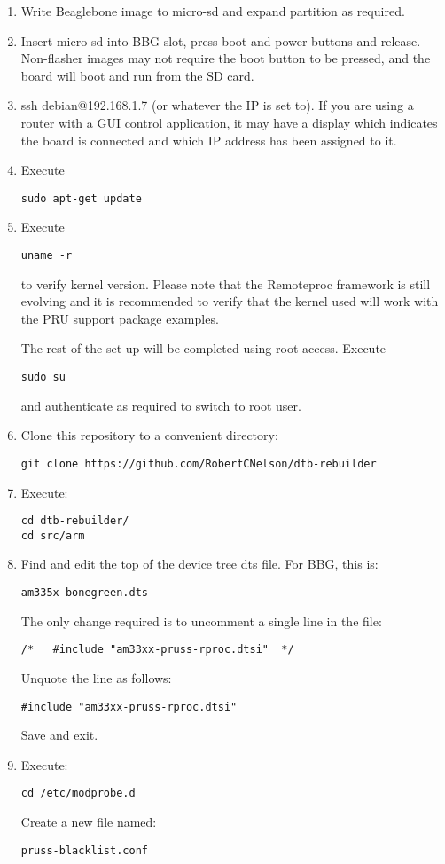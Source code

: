\begin{enumerate}
\item  Write Beaglebone image to micro-sd and expand partition as required.
\item  Insert micro-sd into BBG slot, press boot and power buttons and release.  Non-flasher images may not require the boot button to be pressed, and the board will boot and run from the SD card.
\item  ssh debian@192.168.1.7 (or whatever the IP is set to).  If you are using a router with a GUI control application, it may have a display which indicates the board is connected and which IP address has been assigned to it.
\item  Execute
\begin{verbatim}
sudo apt-get update
\end{verbatim}
\item  Execute
\begin{verbatim}
uname -r
\end{verbatim} 
to verify kernel version.  Please note that the Remoteproc framework is still evolving and it is recommended to verify that the kernel used will work with the PRU support package examples.

The rest of the set-up will be completed using root access.
Execute
\begin{verbatim}
sudo su
\end{verbatim}
and authenticate as required to switch to root user.
\item Clone this repository to a convenient directory:

\begin{verbatim}
git clone https://github.com/RobertCNelson/dtb-rebuilder
\end{verbatim}

\item Execute:
\begin{verbatim}
cd dtb-rebuilder/ 
cd src/arm
\end{verbatim}
\item Find and edit the top of the device tree dts file.
For BBG, this is:
\begin{verbatim}
am335x-bonegreen.dts
\end{verbatim}
The only change required is to uncomment a single line in the file:
\begin{verbatim}
/*   #include "am33xx-pruss-rproc.dtsi"  */
\end{verbatim}

Unquote the line as follows:
\begin{verbatim}
#include "am33xx-pruss-rproc.dtsi"
\end{verbatim}
Save and exit.
\item
Execute:
\begin{verbatim}
cd /etc/modprobe.d
\end{verbatim}
Create a new file named:
\begin{verbatim}
pruss-blacklist.conf
\end{verbatim} 


\end{enumerate}
